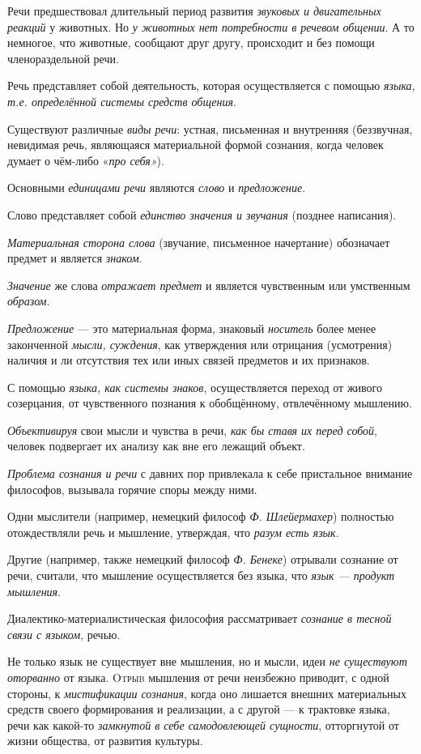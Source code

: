 \documentclass[a4paper,14pt,russian]{extreport}
\begin{document}
Речи предшествовал длительный период развития \emph{звуковых и двигательных реакций} у животных. Но \emph{у животных нет потребности в речевом общении}. А то немногое, что животные, сообщают друг другу, происходит и без помощи членораздельной речи.

Речь представляет собой деятельность, которая осуществляется с помощью \emph{языка, т.е. определённой системы средств общения}.

Существуют различные \emph{виды речи}: устная, письменная и внутренняя (беззвучная, невидимая речь, являющаяся материальной формой сознания, когда человек думает о чём-либо «\emph{про себя»}).

Основными \emph{единицами речи} являются \emph{слово} и \emph{предложение}.

Слово представляет собой \emph{единство значения и звучания} (позднее написания).

\emph{Материальная сторона слова} (звучание, письменное начертание) обозначает предмет и является \emph{знаком}.

\emph{Значение} же слова \emph{отражает предмет} и является чувственным или умственным \emph{образом}.

\emph{Предложение} --- это материальная форма, знаковый \emph{носитель} более менее законченной \emph{мысли, суждения}, как утверждения или отрицания (усмотрения) наличия и ли отсутствия тех или иных связей предметов и их признаков.

С помощью \emph{языка, как системы знаков}, осуществляется переход от живого созерцания, от чувственного познания к обобщённому, отвлечённому мышлению.

\emph{Объективируя} свои мысли и чувства в речи, \emph{как бы ставя их перед собой}, человек подвергает их анализу как вне его лежащий объект.

\emph{Проблема сознания и речи} с давних пор привлекала к себе пристальное внимание философов, вызывала горячие споры между ними.

Одни мыслители (например, немецкий философ \emph{Ф. Шлейермахер}) полностью отождествляли речь и мышление, утверждая, что \emph{разум есть язык}.

Другие (например, также немецкий философ \emph{Ф. Бенеке}) отрывали сознание от речи, считали, что мышление осуществляется без языка, что \emph{язык --- продукт мышления}.

Диалектико-материалистическая философия рассматривает \emph{сознание в тесной связи с языком}, речью.

Не только язык не существует вне мышления, но и мысли, идеи \emph{не существуют оторванно} от языка. \textsc{Otрыb} мышления от речи неизбежно приводит, с одной стороны, к \emph{мистификации сознания}, когда оно лишается внешних материальных средств своего формирования и реализации, а с другой --- к трактовке языка, речи как какой-то \emph{замкнутой в себе самодовлеющей сущности}, отторгнутой от жизни общества, от развития культуры.
\end{document}
